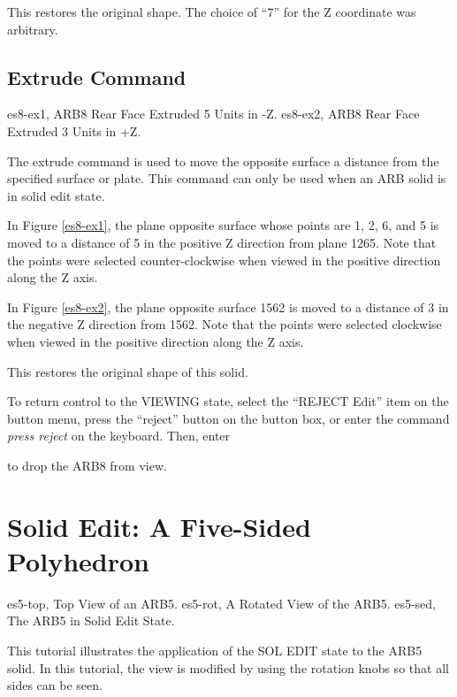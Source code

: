 This restores the original shape.
The choice of ``7'' for the Z coordinate was arbitrary.

\subsection{Extrude Command}
\mfig es8-ex1, ARB8 Rear Face Extruded 5 Units in -Z.
\mfig es8-ex2, ARB8 Rear Face Extruded 3 Units in +Z.

The extrude command is used to move the opposite surface a distance from
the specified surface or plate.
This command can only be used when an ARB solid is in
solid edit state.


In Figure \ref{es8-ex1},
the plane opposite surface whose points are 1, 2, 6, and 5
is moved to a distance of 5 in the positive Z direction from plane 1265.  Note
that the points were selected counter-clockwise when viewed in the positive
direction along the Z axis.


In Figure \ref{es8-ex2},
the plane opposite surface 1562 is moved to a distance of 3
in the negative Z direction from 1562.  Note that the points were selected
clockwise when viewed in the positive direction along the Z axis.


This restores the original shape of this solid.

To return control to the VIEWING state, select the ``REJECT Edit''
item on the button menu, press the ``reject'' button on the button box,
or enter the command {\em press reject} on the keyboard.
Then, enter


to drop the ARB8 from view.

\section{Solid Edit:  A Five-Sided Polyhedron}
\mfig es5-top, Top View of an ARB5.
\mfig es5-rot, A Rotated View of the ARB5.
\mfig es5-sed, The ARB5 in Solid Edit State.

This tutorial illustrates the application of the SOL EDIT state to the ARB5
solid.
In this tutorial, the view is modified by using the rotation
knobs so that all sides can be seen.

